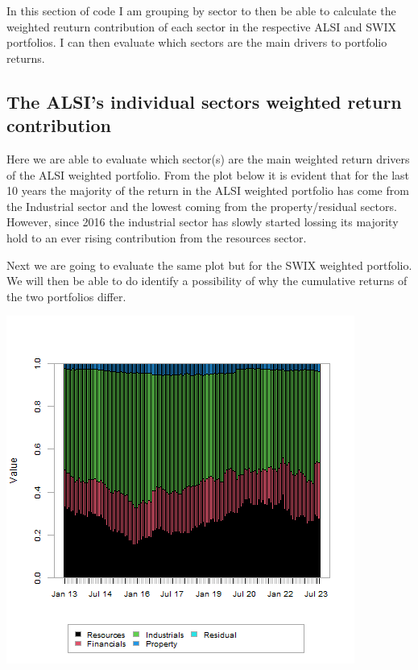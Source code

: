 \documentclass[11pt,preprint, authoryear]{elsarticle}
\let\origfigure\figure
\let\endorigfigure\endfigure
\renewenvironment{figure}[1][2] {
    \expandafter\origfigure\expandafter[H]
} {
    \endorigfigure
}
\numberwithin{equation}{section}
\numberwithin{figure}{section}
\numberwithin{table}{section}
\begin{document}
In this section of code I am grouping by sector to then be able to
calculate the weighted reuturn contribution of each sector in the
respective ALSI and SWIX portfolios. I can then evaluate which sectors
are the main drivers to portfolio returns.

\hypertarget{the-alsis-individual-sectors-weighted-return-contribution}{%
\subsection{The ALSI's individual sectors weighted return
contribution}\label{the-alsis-individual-sectors-weighted-return-contribution}}

Here we are able to evaluate which sector(s) are the main weighted
return drivers of the ALSI weighted portfolio. From the plot below it is
evident that for the last 10 years the majority of the return in the
ALSI weighted portfolio has come from the Industrial sector and the
lowest coming from the property/residual sectors. However, since 2016
the industrial sector has slowly started lossing its majority hold to an
ever rising contribution from the resources sector.

Next we are going to evaluate the same plot but for the SWIX weighted
portfolio. We will then be able to do identify a possibility of why the
cumulative returns of the two portfolios differ.

\begin{figure}[H]

{\centering \includegraphics{Question-3_files/figure-latex/Figure 2-1} 

}

\caption{ALSI sector contribution plot \label{Figure2}}\label{fig:Figure 2}
\end{figure}
\end{document}
